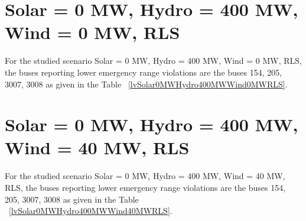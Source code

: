 \documentclass[10pt]{report}
\begin{document}
\section{Solar = 0 MW, Hydro = 400 MW, Wind = 0 MW, RLS}
For the studied scenario Solar = 0 MW, Hydro = 400 MW, Wind = 0 MW, RLS, the buses reporting lower emergency range violations are the buses 154, 205, 3007, 3008 as given in the Table ~\ref{lvSolar0MWHydro400MWWind0MWRLS}.
\begin{table}[H]
\caption{Contingencies reporting bus voltages lower than emergency voltage of 1.1 PU for scenario Solar = 0 MW, Hydro = 400 MW, Wind = 0 MW, RLS}
\label{lvSolar0MWHydro400MWWind0MWRLS}
\centering
{}
\end{table}

\section{Solar = 0 MW, Hydro = 400 MW, Wind = 40 MW, RLS}
For the studied scenario Solar = 0 MW, Hydro = 400 MW, Wind = 40 MW, RLS, the buses reporting lower emergency range violations are the buses 154, 205, 3007, 3008 as given in the Table ~\ref{lvSolar0MWHydro400MWWind40MWRLS}.
\begin{table}[H]
\caption{Contingencies reporting bus voltages lower than emergency voltage of 1.1 PU for scenario Solar = 0 MW, Hydro = 400 MW, Wind = 40 MW, RLS}
\label{lvSolar0MWHydro400MWWind40MWRLS}
\centering
{}
\end{table}
\end{document}
